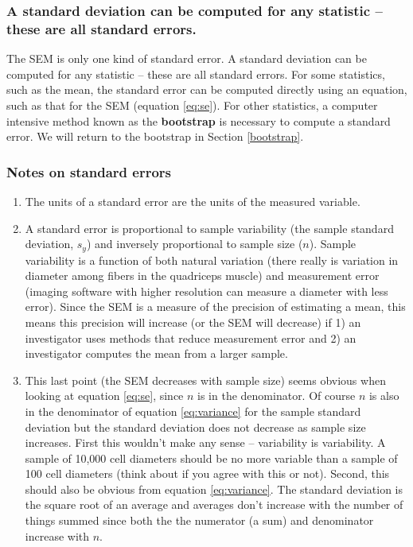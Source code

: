 \documentclass[]{book}
\providecommand{\tightlist}{%
  \setlength{\itemsep}{0pt}\setlength{\parskip}{0pt}}
\begin{document}
\hypertarget{a-standard-deviation-can-be-computed-for-any-statistic-these-are-all-standard-errors.}{%
\subsubsection{A standard deviation can be computed for any statistic -- these are all standard errors.}\label{a-standard-deviation-can-be-computed-for-any-statistic-these-are-all-standard-errors.}}

The SEM is only one kind of standard error. A standard deviation can be computed for any statistic -- these are all standard errors. For some statistics, such as the mean, the standard error can be computed directly using an equation, such as that for the SEM (equation \eqref{eq:se}). For other statistics, a computer intensive method known as the \textbf{bootstrap} is necessary to compute a standard error. We will return to the bootstrap in Section \ref{bootstrap}.

\hypertarget{notes-on-standard-errors}{%
\subsubsection{Notes on standard errors}\label{notes-on-standard-errors}}

\begin{enumerate}
\def\labelenumi{\arabic{enumi}.}
\tightlist
\item
  The units of a standard error are the units of the measured variable.
\item
  A standard error is proportional to sample variability (the sample standard deviation, \(s_y\)) and inversely proportional to sample size (\(n\)). Sample variability is a function of both natural variation (there really is variation in diameter among fibers in the quadriceps muscle) and measurement error (imaging software with higher resolution can measure a diameter with less error). Since the SEM is a measure of the precision of estimating a mean, this means this precision will increase (or the SEM will decrease) if 1) an investigator uses methods that reduce measurement error and 2) an investigator computes the mean from a larger sample.
\item
  This last point (the SEM decreases with sample size) seems obvious when looking at equation \eqref{eq:se}, since \(n\) is in the denominator. Of course \(n\) is also in the denominator of equation \eqref{eq:variance} for the sample standard deviation but the standard deviation does not decrease as sample size increases. First this wouldn't make any sense -- variability is variability. A sample of 10,000 cell diameters should be no more variable than a sample of 100 cell diameters (think about if you agree with this or not). Second, this should also be obvious from equation \eqref{eq:variance}. The standard deviation is the square root of an average and averages don't increase with the number of things summed since both the the numerator (a sum) and denominator increase with \(n\).
\end{enumerate}
\end{document}

